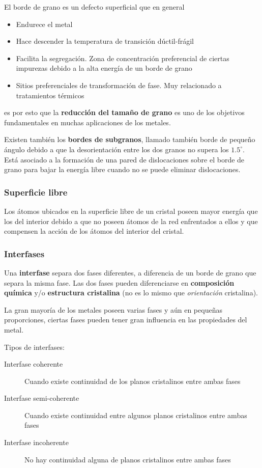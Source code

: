 El borde de grano es un defecto superficial que en general

\begin{itemize}
    \item Endurece el metal
    \item Hace descender la temperatura de transición dúctil-frágil
    \item Facilita la segregación. Zona de concentración preferencial de ciertas impurezas debido a la alta energía de un borde de grano
    \item Sitios preferenciales de transformación de fase. Muy relacionado a tratamientos térmicos
\end{itemize}

es por esto que la \textbf{reducción del tamaño de grano} es uno de los objetivos fundamentales en muchas aplicaciones de los metales.

Existen también los \textbf{bordes de subgranos}, llamado también borde de pequeño ángulo debido a que la desorientación entre los dos granos no supera los $1.5^\circ$. Está asociado a la formación de una pared de dislocaciones sobre el borde de grano para bajar la energía libre cuando no se puede eliminar dislocaciones.


\subsubsection{Superficie libre}

Los átomos ubicados en la superficie libre de un cristal poseen mayor energía que los del interior debido a que no poseen átomos de la red enfrentados a ellos y que compensen la acción de los átomos del interior del cristal.


\subsubsection{Interfases}

Una \textbf{interfase} separa dos fases diferentes, a diferencia de un borde de grano que separa la misma fase. Las dos fases pueden diferenciarse en \textbf{composición química} y/o \textbf{estructura cristalina} (no es lo mismo que \textit{orientación} cristalina).

La gran mayoría de los metales poseen varias fases y aún en pequeñas proporciones, ciertas fases pueden tener gran influencia en las propiedades del metal.

Tipos de interfases:

\begin{description}
	\item[Interfase coherente] Cuando existe continuidad de los planos cristalinos entre ambas fases
	\item[Interfase semi-coherente] Cuando existe continuidad entre algunos planos cristalinos entre ambas fases
	\item[Interfase incoherente] No hay continuidad alguna de planos cristalinos entre ambas fases  
\end{description}



